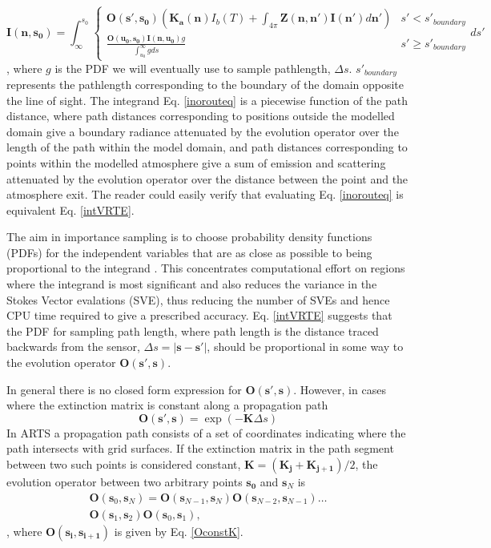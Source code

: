 \begin{equation}
\mathbf{I(n,s_0)}=\int^{s_0}_\infty\left\{\begin{array}{rl}
\mathbf{O(s',s_0)}\left(\mathbf{K_a(n)}I_b(T)
+\int_{4\pi}\mathbf{Z(n,n')}\mathbf{I(n')}d\mathbf{n'}\right) & s'< s'_{boundary} \\
\frac{\mathbf{O(u_0,s_0)I(n,u_0)}g}{\int^\infty_{u_0}gds} & s'\ge s'_{boundary}
\end{array}ds'\right.
\label{inorouteq}
\end{equation}
, where $g$ is the PDF we will eventually use to sample pathlength,
$\Delta s$. $s'_{boundary}$ represents the pathlength corresponding to
the boundary of the domain opposite the line of sight.
The integrand Eq. \ref{inorouteq} is a piecewise function of the
path distance, where path distances corresponding to positions outside
the modelled domain give a boundary radiance attenuated by the evolution
operator over the length of the path within the model domain, and path
distances corresponding to points within the modelled atmosphere give
a sum of emission and scattering attenuated by the evolution operator
over the distance between the point and the atmosphere exit. 
The reader
could easily verify that evaluating Eq. \ref{inorouteq} is equivalent
Eq. \ref{intVRTE}. 

The aim in importance sampling is to choose probability density functions
(PDFs) for the independent variables that are
as close as possible to being proportional to the integrand
\cite{liu:01}. This concentrates computational effort on regions where
the integrand is most significant and also reduces the variance in the Stokes
Vector evalations (SVE), thus reducing
the number of SVEs and hence CPU time required to give a
prescribed accuracy.  Eq. \ref{intVRTE} suggests that the PDF for
sampling path length, where path length is the distance traced backwards
from the sensor, $\Delta s=\left|\mathbf{s}-\mathbf{s'}\right|$, should be
proportional in some way to the evolution
operator $\mathbf{O(s',s)}$. 

In general there is no closed form expression for $\mathbf{O(s',s)}$.
However, in cases where the extinction matrix is constant along a
propagation path
\begin{equation}
\mathbf{O(s',s)}=\exp\left(-\mathbf{K}\Delta s\right)
\label{OconstK}
\end{equation}
In ARTS a propagation path consists of a set of coordinates
indicating where the path intersects with grid surfaces.  If the
extinction matrix in the path segment between two such points is
considered constant, $\mathbf{K}=(\mathbf{K_j}+\mathbf{K_{j+1}})/2$,
the evolution operator between two arbitrary points $\mathbf{s_0}$ and
$\mathbf{s}_N$ is
\begin{eqnarray}
\mathbf{O}(\mathbf{s}_0,\mathbf{s}_N) =
\mathbf{O}(\mathbf{s}_{N-1},\mathbf{s}_N)
\mathbf{O}(\mathbf{s}_{N-2},\mathbf{s}_{N-1}) \dots \nonumber\\
\mathbf{O}(\mathbf{s}_1,\mathbf{s}_2)\mathbf{O}(\mathbf{s}_0,\mathbf{s}_1),
\label{Ogeneral}
\end{eqnarray}
, where $\mathbf{O(s_i,s_{i+1})}$ is given by Eq. \ref{OconstK}.

